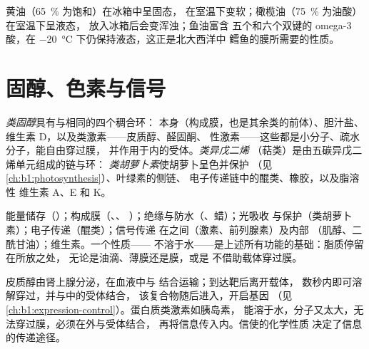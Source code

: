 \begin{example}[黄油、橄榄油与鱼油]\label{ex:b1:lipids:kitchen}
黄油（\qty{65}{\%} 为饱和）在冰箱中呈固态，
在室温下变软；橄榄油（\qty{75}{\%} 为油酸）在室温下呈液态，
放入冰箱后会变浑浊；鱼油富含
五个和六个双键的 omega-3 酸，在
\qty{-20}{\celsius} 下仍保持液态，这正是北大西洋中
鳕鱼的膜所需要的性质。
\end{example}

\section{固醇、色素与信号}

\begin{definition}\label{def:b1:lipids:steroids}
\emph{类固醇}具有与相同的四个稠合环：
本身（构成膜，也是其余类的前体）、胆汁盐、
维生素 D，以及类激素——皮质醇、醛固酮、
性激素——这些都是小分子、疏水分子，能自由穿过膜，
并作用于内的受体。\emph{类异戊二烯}
（萜类）是由五碳异戊二烯单元组成的链与环：
\emph{类胡萝卜素}使胡萝卜呈色并保护
（见\cref{ch:b1:photosynthesis}）、叶绿素的侧链、
电子传递链中的醌类、橡胶，以及脂溶性
维生素 A、E 和 K。
\end{definition}

\begin{proposition}[脂质的功能]\label{prop:b1:lipids:functions}
能量储存（）；构成膜（、、
）；绝缘与防水（、蜡）；光吸收
与保护（类胡萝卜素）；电子传递（醌类）；信号传递
在之间（激素、前列腺素）及内部
（肌醇、二酰甘油）；维生素。一个性质——
不溶于水——是上述所有功能的基础：脂质停留在所放之处，
无论是油滴、薄膜还是膜，或是
不借助载体穿过膜。
\end{proposition}

\begin{example}[不需要表面受体的激素]\label{ex:b1:lipids:steroidhormone}
皮质醇由肾上腺分泌，在血液中与
结合运输；到达靶后离开载体，
数秒内即可溶解穿过，并与中的受体结合，
该复合物随后进入，开启基因
（见\cref{ch:b1:expression-control}）。蛋白质类激素如胰岛素，
能溶于水，分子又太大，无法穿过膜，必须在外与受体结合，
再将信息传入内。信使的化学性质
决定了信息的传递途径。
\end{example}

